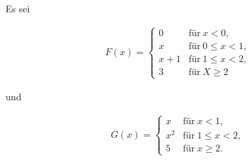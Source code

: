 
\begin{exercise}

Es sei

\begin{align*}
    F(x)
    =
    \begin{cases}
        0     & \text{für}~ x < 0, \\
        x     & \text{für}~ 0 \leq x < 1, \\
        x + 1 & \text{für}~ 1 \leq x < 2, \\
        3     & \text{für}~ X \geq 2
    \end{cases}
\end{align*}

und

\begin{align*}
    G(x)
    =
    \begin{cases}
        x   & \text{für}~ x < 1, \\
        x^2 & \text{für}~ 1 \leq x < 2, \\
        5   & \text{für}~ x \geq 2.
    \end{cases}
\end{align*}

\end{exercise}


